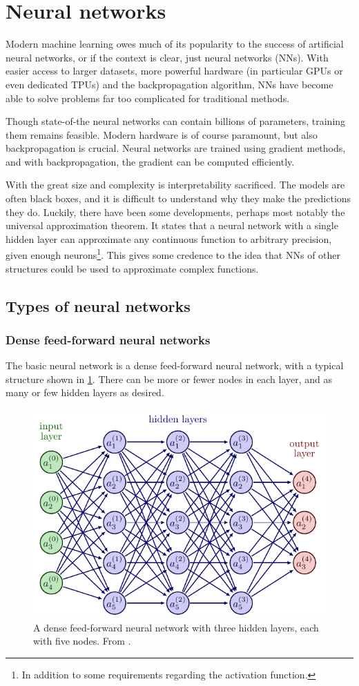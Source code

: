 \section{Neural networks}
Modern machine learning owes much of its popularity to the success of artificial neural networks, or if the context is clear, just neural networks (NNs).
With easier access to larger datasets, more powerful hardware (in particular GPUs or even dedicated TPUs) and the backpropagation algorithm, NNs have become able to solve problems far too complicated for traditional methods.

Though state-of-the neural networks can contain billions of parameters, training them remains feasible.
Modern hardware is of course paramount, but also backpropagation is crucial.
Neural networks are trained using gradient methods, and with backpropagation, the gradient can be computed efficiently.

With the great size and complexity is interpretability sacrificed.
The models are often black boxes, and it is difficult to understand why they make the predictions they do.
Luckily, there have been some developments, perhaps most notably the universal approximation theorem.
It states that a neural network with a single hidden layer can approximate any continuous function to arbitrary precision, given enough neurons\footnote{In addition to some requirements regarding the activation function.}.
This gives some credence to the idea that NNs of other structures could be used to approximate complex functions.


\subsection{Types of neural networks}
\subsubsection{Dense feed-forward neural networks}
The basic neural network is a dense feed-forward neural network, with a typical structure shown in \cref{fig:nn}.
There can be more or fewer nodes in each layer, and as many or few hidden layers as desired.

\begin{figure}
    \centering
    \includegraphics[width=0.8\linewidth, page=4]{tex/02_ml/neural_networks.pdf}
    \caption{
        A dense feed-forward neural network with three hidden layers, each with five nodes.
        From \cite{nn_figs}.
    }
    \label{fig:nn}
\end{figure}

